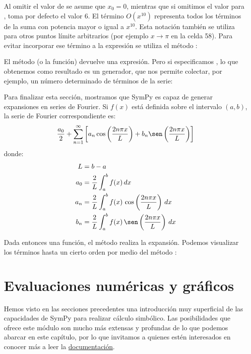 Al omitir el valor de  se asume que $x_0 = 0$, mientras que si omitimos el valor para , toma por defecto el valor 6. El término $O(x^{10})$ representa todos los términos de la suma con potencia mayor o igual a $x^{10}$. Esta notación también se utiliza para otros puntos límite arbitrarios (por ejemplo $x \rightarrow \pi$ en la celda 58). Para evitar incorporar ese término a la expresión se utiliza el método :

El método (o la función)  devuelve una expresión. Pero si especificamos , lo que obtenemos como resultado es un generador, que nos permite colectar, por ejemplo, un número determinado de términos de la serie:

Para finalizar esta sección, mostramos que SymPy es capaz de generar expansiones en series de Fourier. Si $f(x)$ está definida sobre el intervalo $(a, b)$, la serie de Fourier correspondiente es:
\[ \frac{a_0}{2} + \sum_{n = 1}^{\infty} \left[a_n \cos\left(\frac{2 n \pi x}{L}\right) + b_n \sen\left(\frac{2 n \pi x}{L}\right)\right] \]
donde:
\begin{align*}
    L &= b - a \\
    a_0 &= \frac{2}{L} \int_a^b f(x) \, dx \\
    a_n &= \frac{2}{L} \int_a^b f(x) \, \cos \left(\frac{2 n \pi x}{L}\right) \, dx \\
    b_n &= \frac{2}{L} \int_a^b f(x) \, \sen \left(\frac{2 n \pi x}{L}\right) \, dx
\end{align*}

Dada entonces una función, el método  realiza la expansión. Podemos visualizar los términos hasta un cierto orden por medio del método :


\section{Evaluaciones numéricas y gráficos}
Hemos visto en las secciones precedentes una introducción muy superficial de las capacidades de SymPy para realizar cálculo simbólico. Las posibilidades que ofrece este módulo son mucho más extensas y profundas de lo que podemos abarcar en este capítulo, por lo que invitamos a quienes estén interesados en conocer más a leer la \href{https://docs.sympy.org/latest/index.html}{documentación}. 

